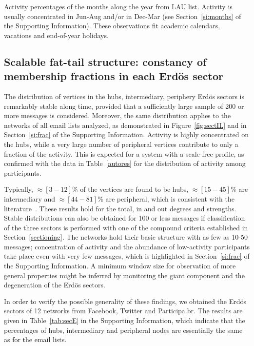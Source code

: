 \documentclass[%
	aip,
	jmp,%
	amsmath,amssymb,
	reprint,%
]{revtex4-1}
\begin{document}
\begin{table}
	\caption{Activity percentages of the months along the year from LAU list. Activity is usually concentrated in Jun-Aug and/or in Dec-Mar (see Section~\ref{si:months} of the Supporting Information). These observations fit academic calendars, vacations and end-of-year holidays.}
	\footnotesize
	
	\label{tab:min2}
\end{table}

\subsection{Scalable fat-tail structure: constancy of membership fractions in each Erd\"os sector}\label{subsec:pih}

The distribution of vertices in the hubs, intermediary, periphery Erd\"os sectors is remarkably stable along time, provided that a sufficiently large sample of 200 or more messages is considered. 
Moreover, the same distribution applies to the networks of all email lists analyzed, as demonstrated in Figure~\ref{fig:sectIL} and in Section~\ref{si:frac} of the Supporting Information. 
Activity is highly concentrated on the hubs, while a very large number of peripheral vertices contribute to only a fraction of the activity. This is expected for a system with a scale-free profile, as confirmed with the data in Table~\ref{autores} for the distribution of activity among participants.

Typically, $\approx [3-12]\%$ of the vertices are found to be hubs, $\approx [15-45]\%$ are intermediary and $\approx [44-81]\%$ are peripheral, which is consistent with the literature~\cite{secFree}.
These results hold for the total, in and out degrees and strengths.
Stable distributions can also be obtained for 100 or less messages if classification of the three sectors is performed with one of the compound criteria established in Section~\ref{sectioning}. 
The networks hold their basic structure with as few as 10-50 messages; concentration of activity and the abundance of low-activity participants take place even with very few messages, which is highlighted in Section~\ref{si:frac} of the Supporting Information.
A minimum window size for observation of more general properties might be inferred by monitoring the giant component and the degeneration of the Erd\"os sectors.

In order to verify the possible generality of these findings, we obtained the Erd\"os sectors of 12 networks from Facebook, Twitter and Participa.br. The results are given in Table~\ref{tab:secE} in the Supporting Information, which indicate that the percentages of hubs, intermediary and peripheral nodes are essentially the same as for the email lists.
\end{document}
